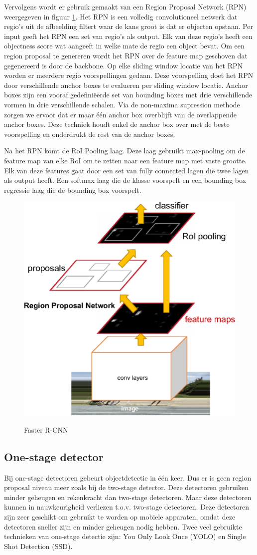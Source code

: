 Vervolgens wordt er gebruik gemaakt van een Region Proposal Network (RPN) weergegeven in figuur \ref{fig:faster-r-cnn}. 
Het RPN is een volledig convolutioneel netwerk dat regio's uit de afbeelding filtert waar de kans groot is dat er objecten opstaan.
Per input geeft het RPN een set van regio's als output.
Elk van deze regio's heeft een objectness score wat aangeeft in welke mate de regio een object bevat.
Om een region proposal te genereren wordt het RPN over de feature map geschoven dat gegenereerd is door de backbone.
Op elke sliding window locatie van het RPN worden er meerdere regio voorspellingen gedaan.
Deze voorspelling doet het RPN door verschillende anchor boxes te evalueren per sliding window locatie.
Anchor boxes zijn een vooraf gedefini\"eerde set van bounding boxes met drie verschillende vormen in drie verschillende schalen.
Via de non-maxima supression methode zorgen we ervoor dat er maar \'e\'en anchor box overblijft van de overlappende anchor boxes. 
Deze techniek houdt enkel de anchor box over met de beste voorspelling en onderdrukt de rest van de anchor boxes.

Na het RPN komt de RoI Pooling laag.
Deze laag gebruikt max-pooling om de feature map van elke RoI om te zetten naar een feature map met vaste grootte.
Elk van deze features gaat door een set van fully connected lagen die twee lagen als output heeft.
Een softmax laag die de klasse voorspelt en een bounding box regressie laag die de bounding box voorspelt.

\begin{figure}[!ht]
    \centering
 	\includegraphics[width=0.35\linewidth]{fig/Faster-R-CNN.png}
 	\caption{Faster R-CNN}
 	\label{fig:faster-r-cnn}
	\cite{ren_faster_2016}
\end{figure}

\subsection{One-stage detector}
Bij one-stage detectoren gebeurt objectdetectie in \'e\'en keer. 
Dus er is geen region proposal niveau meer zoals bij de two-stage detector. 
Deze detectoren gebruiken minder geheugen en rekenkracht dan two-stage detectoren.
Maar deze detectoren kunnen in nauwkeurigheid verliezen t.o.v. two-stage detectoren.
Deze detectoren zijn zeer geschikt om gebruikt te worden op mobiele apparaten, omdat deze detectoren sneller zijn en minder geheugen nodig hebben.
Twee veel gebruikte technieken van one-stage detectie zijn: You Only Look Once (YOLO) en Single Shot Detection (SSD).

